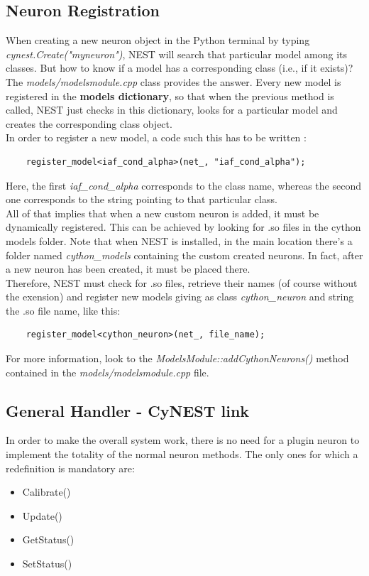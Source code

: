\documentclass{article}
\begin{document}
\subsection{Neuron Registration}
When creating a new neuron object in the Python terminal by typing\\ \emph{cynest.Create("myneuron")}, NEST will search that particular model among its classes. But how to know if a model has a corresponding class (i.e., if it exists)? The \emph{models/modelsmodule.cpp} class provides the answer. Every new model is registered in the \textbf{models dictionary}, so that when the previous method is called, NEST just checks in this dictionary, looks for a particular model and creates the corresponding class object.\\
In order to register a new model, a code such this has to be written :
\begin{verbatim}
	register_model<iaf_cond_alpha>(net_, "iaf_cond_alpha");
\end{verbatim}
Here, the first \emph{iaf\_cond\_alpha} corresponds to the class name, whereas the second one corresponds to the string pointing to that particular class.\\
All of that implies that when a new custom neuron is added, it must be dynamically registered. This can be achieved by looking for .so files in the cython models folder. Note that when NEST is installed, in the main location there's a folder named \emph{cython\_models} containing the custom created neurons. In fact, after a new neuron has been created, it must be placed there.\\
Therefore, NEST must check for .so files, retrieve their names (of course without the exension) and  register new models giving as class \emph{cython\_neuron} and string the .so file name, like this:
\begin{verbatim}
	register_model<cython_neuron>(net_, file_name);
\end{verbatim}
For more information, look to the \emph{ModelsModule::addCythonNeurons()} method contained in the \emph{models/modelsmodule.cpp} file.

\subsection{General Handler - CyNEST link}
In order to make the overall system work, there is no need for a plugin neuron to implement the totality of the normal neuron methods. The only ones for which a redefinition is mandatory are:
\begin{itemize}
\item Calibrate()
\item Update()
\item GetStatus()
\item SetStatus()
\end{itemize}
\end{document}
